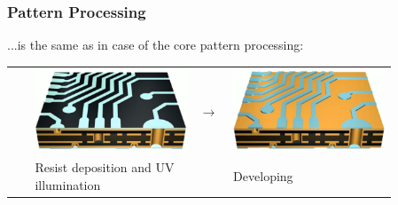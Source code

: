 \documentclass{beamer}
\begin{document}
	\begin{frame}
    \frametitle{Pattern Processing}
		...is the same as in case of the core pattern processing:
		\begin{center}
		
			\begin{tabular}{m{0.05\linewidth} m{0.38\linewidth} m{0.05\linewidth} m{0.38\linewidth}}
			 \Large & \includegraphics[scale=0.12]{obr13_vnejsiOsvit.png} & \Large\textbf{$\rightarrow$} & \includegraphics[scale=0.12]{obr14_vnejsiVyvolani.png}\\
			 & Resist deposition and UV illumination & & Developing \\

\end{tabular}
\end{center}
\end{frame}
\end{document}
